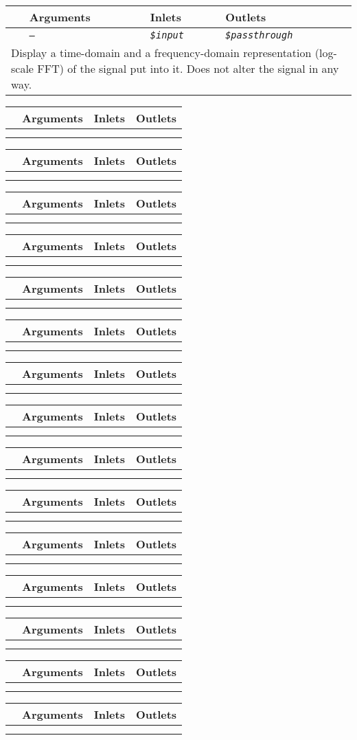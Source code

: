 \newcommand{\pdobject}[5]{
\begin{table}[H]
\begin{tabular}{llll}
 & \textbf{Arguments} & \textbf{Inlets} & \textbf{Outlets} \\ \hline
\rowcolor[HTML]{EFEFEF} 
\multicolumn{1}{l|}{\cellcolor[HTML]{EFEFEF}\textbf{\texttt{#1}}} & \multicolumn{1}{l|}{\cellcolor[HTML]{EFEFEF}\textit{\texttt{#2}}} & \multicolumn{1}{l|}{\cellcolor[HTML]{EFEFEF}\textit{\texttt{#3}}} & \multicolumn{1}{l}{\cellcolor[HTML]{EFEFEF}\textit{\texttt{#4}}} \\ \hline
\multicolumn{4}{p{\textwidth}}{#5} \\ 
\end{tabular}
\end{table}
}

\pdobject{analyser\char`~}{–}{\$input}{\$passthrough}{
Display a time-domain and a frequency-domain representation (log-scale FFT) of the signal put into it. Does not alter the signal in any way.}

\pdobject{defaultarg}{}{}{}{}
\pdobject{fmt\char`~}{}{}{}{}
\pdobject{formatlabel}{}{}{}{}
\pdobject{interface}{}{}{}{}
\pdobject{lfmodel\char`~}{}{}{}{}
\pdobject{master\char`~}{}{}{}{}
\pdobject{msgpipe}{}{}{}{}
\pdobject{quasirandomdrift}{}{}{}{}
\pdobject{rdefault}{}{}{}{}
\pdobject{rls}{}{}{}{}
\pdobject{round}{}{}{}{}
\pdobject{rqlist}{}{}{}{}
\pdobject{snapchange\char`~}{}{}{}{}
\pdobject{source\char`~}{}{}{}{}
\pdobject{synth}{}{}{}{}
